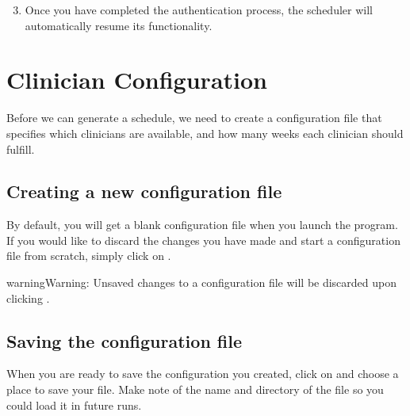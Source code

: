 \documentclass[letterpaper,10pt,english]{sphinxmanual}
\begin{document}
\begin{figure}[htbp]
\centering
{}\end{figure}

\begin{DUlineblock}{0em}
\item[] 
\end{DUlineblock}
\begin{enumerate}
\setcounter{enumi}{2}
\item {} 
Once you have completed the authentication process, the scheduler will
automatically resume its functionality.

\end{enumerate}


\section{Clinician Configuration}
\label{\detokenize{index:clinician-configuration}}\label{\detokenize{index:id3}}
Before we can generate a schedule, we need to create a configuration file
that specifies which clinicians are available, and how many weeks each
clinician should fulfill.


\subsection{Creating a new configuration file}
\label{\detokenize{index:creating-a-new-configuration-file}}
By default, you will get a blank configuration file when you launch
the program. If you would like to discard the changes you have made and
start a configuration file from scratch, simply click on .

\begin{figure}[htbp]
\centering
{}\end{figure}

\begin{sphinxadmonition}{warning}{Warning:}
Unsaved changes to a configuration file will be discarded upon clicking
.
\end{sphinxadmonition}


\subsection{Saving the configuration file}
\label{\detokenize{index:saving-the-configuration-file}}
When you are ready to save the configuration you created, click on
 and choose a place to save your file. Make note of the name
and directory of the file so you could load it in future runs.
\end{document}
